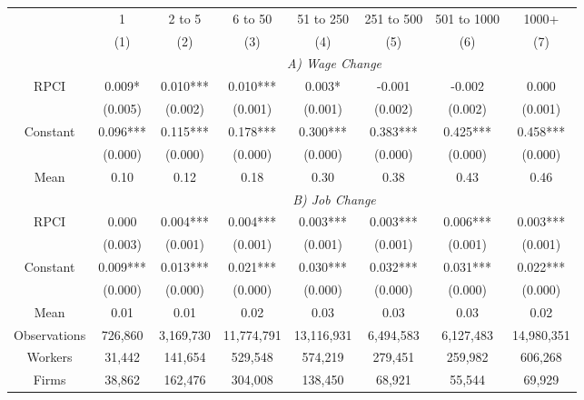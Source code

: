 \begin{tabular}{cccccccc}
\toprule
\toprule
      & 1     & 2 to 5 & 6 to 50 & 51 to 250 & 251 to 500 & 501 to 1000 & 1000+ \\
      & (1)   & (2)   & (3)   & (4)   & (5)   & (6)   & (7) \\
\cmidrule{2-8}      & \multicolumn{7}{c}{\textit{A) Wage Change}} \\
\midrule
RPCI  & 0.009* & 0.010*** & 0.010*** & 0.003* & -0.001 & -0.002 & 0.000 \\
      & (0.005) & (0.002) & (0.001) & (0.001) & (0.002) & (0.002) & (0.001) \\
Constant & 0.096*** & 0.115*** & 0.178*** & 0.300*** & 0.383*** & 0.425*** & 0.458*** \\
      & (0.000) & (0.000) & (0.000) & (0.000) & (0.000) & (0.000) & (0.000) \\
Mean  & 0.10  & 0.12  & 0.18  & 0.30  & 0.38  & 0.43  & 0.46 \\
\cmidrule{2-8}      & \multicolumn{7}{c}{\textit{B) Job Change}} \\
\midrule
RPCI  & 0.000 & 0.004*** & 0.004*** & 0.003*** & 0.003*** & 0.006*** & 0.003*** \\
      & (0.003) & (0.001) & (0.001) & (0.001) & (0.001) & (0.001) & (0.001) \\
Constant & 0.009*** & 0.013*** & 0.021*** & 0.030*** & 0.032*** & 0.031*** & 0.022*** \\
      & (0.000) & (0.000) & (0.000) & (0.000) & (0.000) & (0.000) & (0.000) \\
Mean  & 0.01  & 0.01  & 0.02  & 0.03  & 0.03  & 0.03  & 0.02 \\
Observations & 726,860 & 3,169,730 & 11,774,791 & 13,116,931 & 6,494,583 & 6,127,483 & 14,980,351 \\
Workers & 31,442 & 141,654 & 529,548 & 574,219 & 279,451 & 259,982 & 606,268 \\
Firms & 38,862 & 162,476 & 304,008 & 138,450 & 68,921 & 55,544 & 69,929 \\
\bottomrule
\bottomrule
\end{tabular}%
